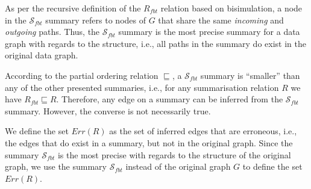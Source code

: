 %

As per the recursive definition of the $R_{fbt}$ relation based on bisimulation, a node in the $\mathcal{S}_{fbt}$ summary refers to nodes of $G$ that share the same \emph{incoming} and \emph{outgoing} paths. Thus, the $\mathcal{S}_{fbt}$ summary is the most precise summary for a data graph with regards to the structure, i.e., all paths in the summary do exist in the original data graph.

According to the partial ordering relation $\sqsubseteq$, a $\mathcal{S}_{fbt}$ summary is ``smaller'' than any of the other presented summaries, i.e., for any summarisation relation $R$ we have $R_{fbt} \sqsubseteq R$. Therefore, any edge on a summary can be inferred from the $\mathcal{S}_{fbt}$ summary. However, the converse is not necessarily true.

We define the set $Err(R)$ as the set of inferred edges that are erroneous, i.e., the edges that do exist in a summary, but not in the original graph. Since the summary $\mathcal{S}_{fbt}$ is the most precise with regards to the structure of the original graph, we use the summary $\mathcal{S}_{fbt}$ instead of the original graph $G$ to define the set $Err(R)$.


